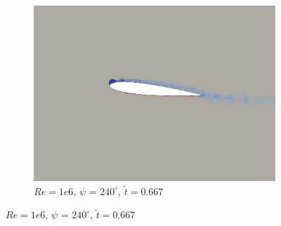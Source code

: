 \begin{figure}[H]
\begin{subfigure}[b]{0.32\textwidth}
		\includegraphics[width=1\textwidth]{figures/Vorticity_plots/Re_1m_1pt2/phase_240.png}
		\caption{$Re=1e6$, $\psi$ = $240^\circ$, $\tilde{t}=0.667$}
		\label{fig:Re_1m_1pt2_phi240}
	\end{subfigure}
	

\end{figure}
